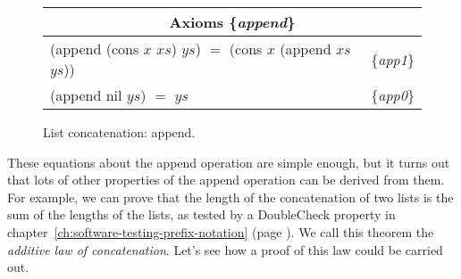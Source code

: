 \begin{figure}
\begin{tabular}{ll}
\multicolumn{2}{c}{Axioms \{\emph{append}\}} \\
\hline
\textsf{(append (cons $x$ $xs$) $ys$)} $=$ \textsf{(cons $x$ (append $xs$ $ys$))} & \{\emph{app1}\} \\
\textsf{(append nil $ys$)} $=$  $ys$                                     & \{\emph{app0}\} \\
\end{tabular}
\caption{List concatenation: \textsf{append}.}
\label{append-equations}
\end{figure}

These equations about the append operation are simple enough,
but it turns out that lots of other properties of the
\textsf{append} operation can be derived from them.
For example, we can prove that the length of
the concatenation of two lists is the sum of the lengths of the lists,
as tested by a DoubleCheck property in
chapter~\ref{ch:software-testing-prefix-notation} (page \pageref{additive-lengths-test}).
We call this theorem the \emph{additive law of concatenation}.
Let's see how a proof of this law could be carried out.

